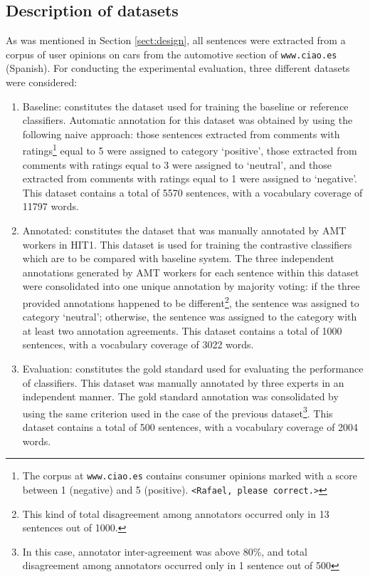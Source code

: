 \documentclass[11pt,letterpaper]{article}
\begin{document}
\subsection{Description of datasets}
\label{datasets}

As was mentioned in Section \ref{sect:design}, all sentences were extracted from a corpus of user opinions on cars from the automotive section of \texttt{www.ciao.es} (Spanish). For conducting the experimental evaluation, three different datasets were considered:

\begin{enumerate}
\item Baseline: constitutes the dataset used for training the baseline or reference classifiers. 
Automatic annotation for this dataset was obtained by using the following naive approach: those sentences extracted from
comments with ratings\footnote{The corpus at \texttt{www.ciao.es} contains consumer opinions marked with a score between 1 (negative) and 5 (positive). \texttt{<Rafael, please correct.>}} equal to 5 were assigned to category `positive', those extracted from comments with ratings 
equal to 3 were assigned to `neutral', and those extracted from comments with ratings equal to 1 were assigned to
`negative'. This dataset contains a total of 5570 sentences, with a vocabulary coverage of 11797 words. 

\item Annotated: constitutes the dataset that was manually annotated by AMT workers in HIT1.
This dataset is used for training the contrastive classifiers which are to be compared with baseline system.
The three independent annotations generated by AMT workers for each sentence within this dataset were consolidated into one unique annotation
by majority voting: if the three provided annotations happened to be
different\footnote{This kind of total disagreement among annotators occurred only in 13 sentences out of 1000.}, 
the sentence was assigned to category `neutral'; otherwise, the sentence was assigned to the category with
at least two annotation agreements. This dataset contains a total of 1000 sentences, with a vocabulary coverage 
of 3022 words. 

\item Evaluation: constitutes the gold standard used for evaluating the performance of classifiers.
This dataset was manually annotated by three experts in an independent manner. The gold standard annotation
was consolidated by using the same criterion used in the case of the previous dataset\footnote{In this case, 
annotator inter-agreement was above 80\%, and total disagreement among annotators occurred only in 1 sentence
out of 500}. This dataset contains a total of 500 sentences, with a vocabulary coverage of 2004 words.    
\end{enumerate} 
\end{document}
